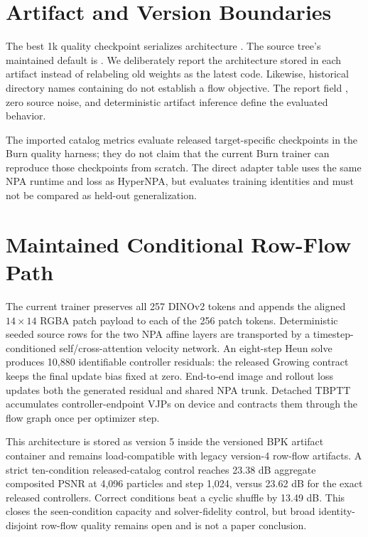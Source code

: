 \documentclass[sigconf,nonacm]{acmart}
\begin{document}
\section{Artifact and Version Boundaries}

The best 1k quality checkpoint serializes architecture
. The source tree's
maintained default is
. We deliberately
report the architecture stored in each artifact instead of relabeling old
weights as the latest code. Likewise, historical directory names containing
 do not establish a flow objective. The report field
, zero source noise, and deterministic
artifact inference define the evaluated behavior.

The imported catalog metrics evaluate released target-specific checkpoints in
the Burn quality harness; they do not claim that the current Burn trainer can
reproduce those checkpoints from scratch. The direct adapter table uses the
same NPA runtime and loss as HyperNPA, but evaluates training identities and
must not be compared as held-out generalization.

\section{Maintained Conditional Row-Flow Path}
\label{app:row-flow}

The current trainer preserves all 257 DINOv2 tokens and appends the aligned
$14\times14$ RGBA patch payload to each of the 256 patch tokens. Deterministic
seeded source rows for the two NPA affine layers are transported by a
timestep-conditioned self/cross-attention velocity network. An eight-step
Heun solve produces 10,880 identifiable controller residuals: the released
Growing contract keeps the final update bias fixed at zero. End-to-end image
and rollout loss updates both the generated residual and shared NPA trunk.
Detached TBPTT accumulates controller-endpoint VJPs on device and contracts
them through the flow graph once per optimizer step.

This architecture is stored as version 5 inside the versioned BPK artifact
container and remains load-compatible with legacy version-4 row-flow
artifacts. A strict ten-condition released-catalog control reaches 23.38 dB
aggregate composited PSNR at 4,096 particles and step 1,024, versus 23.62 dB
for the exact released controllers. Correct conditions beat a cyclic shuffle
by 13.49 dB. This closes the seen-condition capacity and solver-fidelity
control, but broad identity-disjoint row-flow quality remains open and is not
a paper conclusion.



\end{document}
